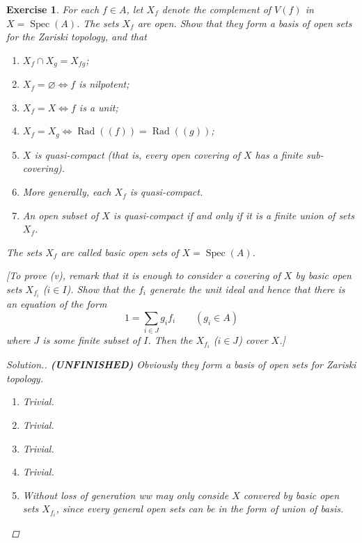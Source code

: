 \documentclass{article}
\theoremstyle{breakstyle}
\newtheorem{exercise}{Exercise}
\newenvironment{solution}
  {\begin{proof}[Solution.]\renewcommand{\qedsymbol}{}}
  {\end{proof}}
\DeclareMathOperator{\rad}{Rad}
\DeclareMathOperator{\spec}{Spec}
\begin{document}
\begin{exercise}
For each \(f\in A\), let \(X_f\) denote the complement of \(V(f)\) in \(X=\spec(A)\). The sets \(X_f\) are open. Show that they form a basis of open sets for the Zariski topology, and that
\begin{enumerate}[label=(\roman*)]
    \item \(X_f\cap X_g=X_{fg}\);
    \item \(X_f=\varnothing\Leftrightarrow f\) is nilpotent;
    \item \(X_f=X\Leftrightarrow f\) is a unit;
    \item \(X_f=X_g\Leftrightarrow \rad((f))=\rad((g))\);
    \item \(X\) is quasi-compact (that is, every open covering of \(X\) has a finite sub-covering).
    \item More generally, each \(X_f\) is quasi-compact.
    \item An open subset of \(X\) is quasi-compact if and only if it is a finite union of sets \(X_f\).
\end{enumerate}
The sets \(X_f\) are called basic open sets of \(X=\spec(A)\).

[To prove (v), remark that it is enough to consider a covering of \(X\) by basic open sets \(X_{f_i}\) (\(i\in I\)). Show that the \(f_i\) generate the unit ideal and hence that there is an equation of the form
\[
1=\sum_{i\in J}g_if_i\qquad(g_i\in A)
\]
where \(J\) is some finite subset of \(I\). Then the \(X_{f_i}\) (\(i\in J\)) cover \(X\).]

\begin{solution}
    \textbf{(UNFINISHED)}
        Obviously they form a basis of open sets for Zariski topology.
        \begin{enumerate}[label=({\roman*})]
            \item Trivial.
            \item Trivial.
            \item Trivial.
            \item Trivial.
            \item Without loss of generation ww may only conside $X$ convered by basic open sets $X_{f_{i}}$,
                since every general open sets can be in the form of union of basis.


\end{enumerate}
\end{solution}
\end{exercise}
\end{document}
